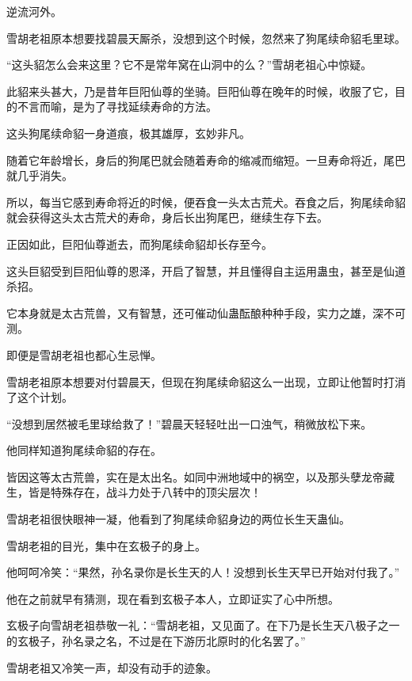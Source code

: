 
\begin{this_body}



逆流河外。

雪胡老祖原本想要找碧晨天厮杀，没想到这个时候，忽然来了狗尾续命貂毛里球。

“这头貂怎么会来这里？它不是常年窝在山洞中的么？”雪胡老祖心中惊疑。

此貂来头甚大，乃是昔年巨阳仙尊的坐骑。巨阳仙尊在晚年的时候，收服了它，目的不言而喻，是为了寻找延续寿命的方法。

这头狗尾续命貂一身道痕，极其雄厚，玄妙非凡。

随着它年龄增长，身后的狗尾巴就会随着寿命的缩减而缩短。一旦寿命将近，尾巴就几乎消失。

所以，每当它感到寿命将近的时候，便吞食一头太古荒犬。吞食之后，狗尾续命貂就会获得这头太古荒犬的寿命，身后长出狗尾巴，继续生存下去。

正因如此，巨阳仙尊逝去，而狗尾续命貂却长存至今。

这头巨貂受到巨阳仙尊的恩泽，开启了智慧，并且懂得自主运用蛊虫，甚至是仙道杀招。

它本身就是太古荒兽，又有智慧，还可催动仙蛊酝酿种种手段，实力之雄，深不可测。

即便是雪胡老祖也都心生忌惮。

雪胡老祖原本想要对付碧晨天，但现在狗尾续命貂这么一出现，立即让他暂时打消了这个计划。

“没想到居然被毛里球给救了！”碧晨天轻轻吐出一口浊气，稍微放松下来。

他同样知道狗尾续命貂的存在。

皆因这等太古荒兽，实在是太出名。如同中洲地域中的祸空，以及那头孽龙帝藏生，皆是特殊存在，战斗力处于八转中的顶尖层次！

雪胡老祖很快眼神一凝，他看到了狗尾续命貂身边的两位长生天蛊仙。

雪胡老祖的目光，集中在玄极子的身上。

他呵呵冷笑：“果然，孙名录你是长生天的人！没想到长生天早已开始对付我了。”

他在之前就早有猜测，现在看到玄极子本人，立即证实了心中所想。

玄极子向雪胡老祖恭敬一礼：“雪胡老祖，又见面了。在下乃是长生天八极子之一的玄极子，孙名录之名，不过是在下游历北原时的化名罢了。”

雪胡老祖又冷笑一声，却没有动手的迹象。


\end{this_body}
